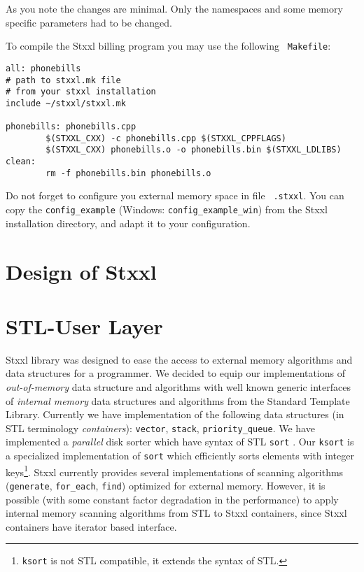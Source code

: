 \documentclass[twoside]{book}
\newcommand{\stxxl}{{\sc Stxxl} }
\begin{document}
As you note the changes are minimal. Only the namespaces and some
memory specific parameters had to be changed.

To compile the \stxxl billing program you may use the following {\tt
Makefile}: 


\begin{verbatim}
all: phonebills
# path to stxxl.mk file
# from your stxxl installation
include ~/stxxl/stxxl.mk

phonebills: phonebills.cpp
        $(STXXL_CXX) -c phonebills.cpp $(STXXL_CPPFLAGS)
        $(STXXL_CXX) phonebills.o -o phonebills.bin $(STXXL_LDLIBS)
clean:
        rm -f phonebills.bin phonebills.o
\end{verbatim}


Do not forget to configure you external memory space in file {\tt
.stxxl}. You can copy the {\tt config\_example} (Windows: {\tt config\_example\_win}) from the \stxxl
installation directory, and adapt it to your configuration.




\chapter{Design of \stxxl}




\chapter{STL-User Layer}
\stxxl library was designed to ease the access to external memory
algorithms and data structures for a programmer. We decided to
equip our implementations of \emph{out-of-memory} data structure and
algorithms with well known generic interfaces of \emph{internal memory}
data structures and algorithms from the Standard Template Library.
Currently we have implementation of the following data structures (in
STL terminology \emph{containers}):
\texttt{vector}, \texttt{stack}, \texttt{priority\_queue}. We
have implemented a \emph{parallel} disk sorter which have syntax of
STL \texttt{sort} \cite{DemSan03}. Our \texttt{ksort} is a specialized
implementation 
of \texttt{sort} which efficiently sorts elements with integer
keys\footnote{\texttt{ksort} is not STL compatible, it extends the
syntax of STL.}. \stxxl currently provides several implementations of
scanning algorithms (\texttt{generate}, \texttt{for\_each},
\texttt{find}) optimized for external memory. However, it is possible
(with some constant factor degradation in the performance) to apply
internal memory scanning algorithms from STL to \stxxl 
containers, since \stxxl containers have iterator based interface.
\end{document}
